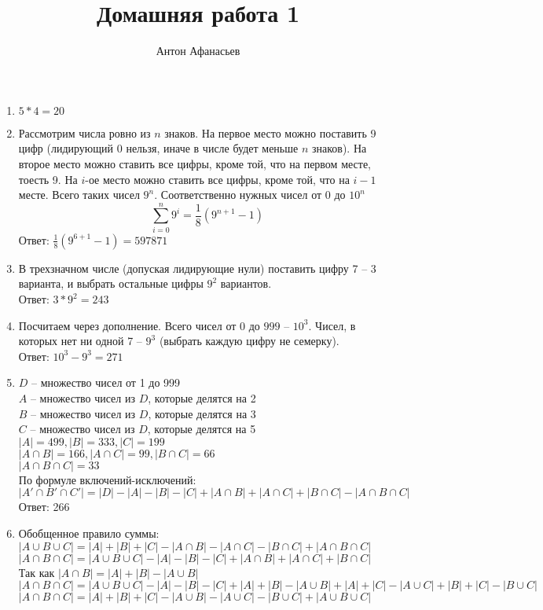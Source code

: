 \documentclass[10pt]{article}
\begin{document}
\title{Домашняя работа 1}
\author{Антон Афанасьев}
\maketitle

\begin{enumerate}[label*=1.\arabic*]
	\item $5*4=20$
	\item Рассмотрим числа ровно из $n$ знаков. На первое место можно поставить 9 цифр (лидирующий 0 нельзя, иначе в числе будет меньше $n$ знаков). На второе место можно ставить все цифры, кроме той, что на первом месте, тоесть 9. На $i$-ое место можно ставить все цифры, кроме той, что на $i-1$ месте. Всего таких чисел $9^n$. Соответственно нужных чисел от $0$ до $10^n$ $$ \sum_{i=0}^n 9^i = \frac{1}{8} (9^{n+1} -1) $$
	Ответ: $\frac{1}{8} (9^{6+1} - 1) = 597871$
	
	\item В трехзначном числе (допуская лидирующие нули) поставить цифру 7 -- 3 варианта, и выбрать остальные цифры $9^2$ вариантов. \\
	Ответ: $3*9^2 = 243$
	
	\item Посчитаем через дополнение. Всего чисел от $0$ до $999$ -- $10^3$. Чисел, в которых нет ни одной 7 -- $9^3$ (выбрать каждую цифру не семерку). \\
	Ответ: $10^3 - 9^3 = 271$
	
	\item $D$ -- множество чисел от 1 до 999\\
	$A$ -- множество чисел из $D$, которые делятся на 2\\
	$B$ -- множество чисел из $D$, которые делятся на 3 \\
	$C$ -- множество чисел из $D$, которые делятся на 5 \\
	$|A| = 499, |B| = 333, |C| = 199$ \\
	$|A \cap B| = 166, |A \cap C| = 99, |B \cap C| = 66$ \\
	$|A \cap B \cap C| = 33$\\
	По формуле включений-исключений:\\
	$|A' \cap B' \cap C'| = |D| - |A| -|B|-|C| + |A \cap B|+|A \cap C| +|B \cap C|-|A \cap B \cap C|$ \\
	Ответ: 266
	
	\item Обобщенное правило суммы:\\
	$|A \cup B \cup C| = |A| + |B| + |C| - |A \cap B| - |A \cap C| - |B \cap C| + |A \cap B \cap C|$\\
	$|A \cap B \cap C| = |A \cup B \cup C|-|A| - |B| - |C| + |A \cap B| + |A \cap C| + |B \cap C|$\\
	Так как $|A \cap B| = |A| + |B| - |A \cup B|$ \\
	$|A \cap B \cap C| = |A \cup B \cup C|-|A| - |B| - |C| + |A| + |B| - |A \cup B| + |A| + |C| - |A \cup C| + |B| + |C| - |B \cup C|$\\
	$|A \cap B \cap C| = |A| + |B| + |C| - |A \cup B|- |A \cup C|- |B \cup C| + |A \cup B \cup C|$
\end{enumerate}
\end{document}
